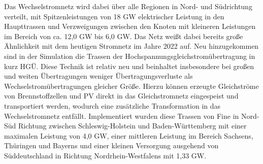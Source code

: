 Das Wechselstromnetz wird dabei über alle Regionen in Nord- und Südrichtung verteilt, mit Spitzenleistungen von 18 GW elektrischer Leistung in den Haupttrassen und Verzweigungen zwischen den Knoten mit kleineren Leistungen im Bereich von ca. 12,0 GW bis 6,0 GW. Das Netz weißt dabei bereits große Ähnlichkeit mit dem heutigen Stromnetz im Jahre 2022 auf. Neu hinzugekommen sind in der Simulation die Trassen der Hochspannungsgleichstromübertragung in kurz HGÜ. Diese Technik ist relativ neu und beinhaltet insbesondere bei großen und weiten Übertragungen weniger Übertragungsverluste als Wechselstromübertragungen gleicher Größe. Hierzu können erzeugte Gleichströme von Brennstoffzellen und PV direkt in das Gleichstromnetz eingespeist und transportiert werden, wodurch eine zusätzliche Transformation in das Wechselstromnetz entfällt. Implementiert wurden diese Trassen von Fine in Nord- Süd Richtung zwischen Schleswig-Holstein und Baden-Württemberg mit einer maximalen Leistung von 4,0 GW, einer mittleren Leistung im Bereich Sachsens, Thüringen und Bayerns und einer kleinen Versorgung ausgehend von Süddeutschland in Richtung Nordrhein-Westfalens mit 1,33 GW.

